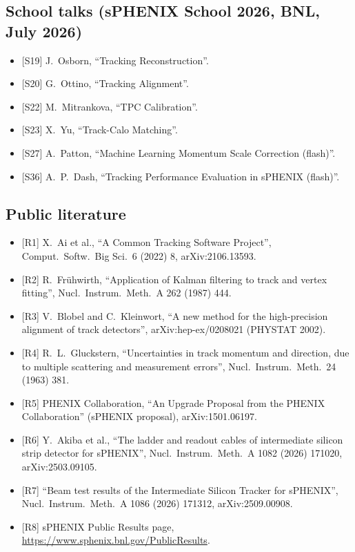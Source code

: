\documentclass[11pt,letterpaper]{article}
\begin{document}
\subsection*{School talks (sPHENIX School 2026, BNL, July 2026)}
\begin{itemize}
\item {[S19]} J.~Osborn, ``Tracking Reconstruction''.
\item {[S20]} G.~Ottino, ``Tracking Alignment''.
\item {[S22]} M.~Mitrankova, ``TPC Calibration''.
\item {[S23]} X.~Yu, ``Track-Calo Matching''.
\item {[S27]} A.~Patton, ``Machine Learning Momentum Scale Correction (flash)''.
\item {[S36]} A.~P.~Dash, ``Tracking Performance Evaluation in sPHENIX (flash)''.
\end{itemize}
\subsection*{Public literature}
\begin{itemize}
\item {[R1]} X.~Ai et al., ``A Common Tracking Software Project'', Comput.\ Softw.\ Big Sci.\ 6 (2022) 8, arXiv:2106.13593.
\item {[R2]} R.~Fr\"uhwirth, ``Application of Kalman filtering to track and vertex fitting'', Nucl.\ Instrum.\ Meth.\ A 262 (1987) 444.
\item {[R3]} V.~Blobel and C.~Kleinwort, ``A new method for the high-precision alignment of track detectors'', arXiv:hep-ex/0208021 (PHYSTAT 2002).
\item {[R4]} R.~L.~Gluckstern, ``Uncertainties in track momentum and direction, due to multiple scattering and measurement errors'', Nucl.\ Instrum.\ Meth.\ 24 (1963) 381.
\item {[R5]} PHENIX Collaboration, ``An Upgrade Proposal from the PHENIX Collaboration'' (sPHENIX proposal), arXiv:1501.06197.
\item {[R6]} Y.~Akiba et al., ``The ladder and readout cables of intermediate silicon strip detector for sPHENIX'', Nucl.\ Instrum.\ Meth.\ A 1082 (2026) 171020, arXiv:2503.09105.
\item {[R7]} ``Beam test results of the Intermediate Silicon Tracker for sPHENIX'', Nucl.\ Instrum.\ Meth.\ A 1086 (2026) 171312, arXiv:2509.00908.
\item {[R8]} sPHENIX Public Results page, \url{https://www.sphenix.bnl.gov/PublicResults}.
\end{itemize}
\end{document}
